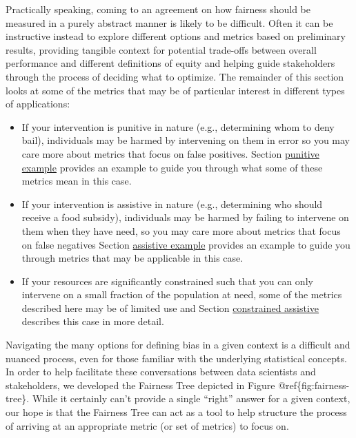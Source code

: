\documentclass[]{krantz}
\begin{document}
Practically speaking, coming to an agreement on how fairness should be
measured in a purely abstract manner is likely to be difficult. Often it
can be instructive instead to explore different options and metrics
based on preliminary results, providing tangible context for potential
trade-offs between overall performance and different definitions of
equity and helping guide stakeholders through the process of deciding
what to optimize. The remainder of this section looks at some of the
metrics that may be of particular interest in different types of
applications:

\begin{itemize}
\item
  If your intervention is punitive in nature (e.g., determining whom to
  deny bail), individuals may be harmed by intervening on them in error
  so you may care more about metrics that focus on false positives.
  Section \protect\hyperlink{sec:punitiveexample}{punitive example}
  provides an example to guide you through what some of these metrics
  mean in this case.
\item
  If your intervention is assistive in nature (e.g., determining who
  should receive a food subsidy), individuals may be harmed by failing
  to intervene on them when they have need, so you may care more about
  metrics that focus on false negatives Section
  \protect\hyperlink{sec:assistiveexample}{assistive example} provides
  an example to guide you through metrics that may be applicable in this
  case.
\item
  If your resources are significantly constrained such that you can only
  intervene on a small fraction of the population at need, some of the
  metrics described here may be of limited use and Section
  \protect\hyperlink{sec:constrainedassistive}{constrained assistive}
  describes this case in more detail.
\end{itemize}

Navigating the many options for defining bias in a given context is a
difficult and nuanced process, even for those familiar with the
underlying statistical concepts. In order to help facilitate these
conversations between data scientists and stakeholders, we developed the
Fairness Tree depicted in Figure @ref\{fig:fairness-tree\}. While it
certainly can't provide a single ``right'' answer for a given context,
our hope is that the Fairness Tree can act as a tool to help structure
the process of arriving at an appropriate metric (or set of metrics) to
focus on.
\end{document}
